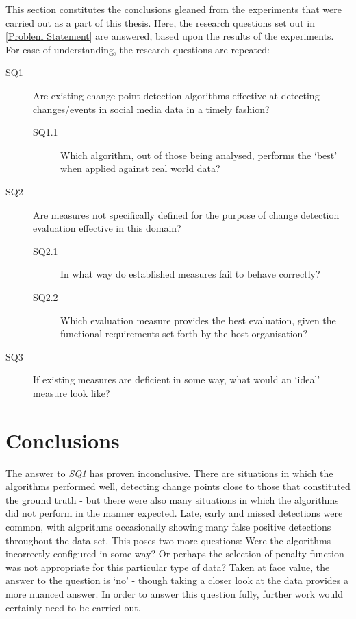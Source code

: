 \documentclass[../main.tex]{subfiles}
\begin{document}
\label{conclusions}

This section constitutes the conclusions gleaned from the experiments that were carried out as a part of this thesis. Here, the research questions set out in \autoref{Problem Statement} are answered, based upon the results of the experiments. For ease of understanding, the research questions are repeated:

\begin{description}
	\item[SQ1] Are existing change point detection algorithms effective at detecting changes/events in social media data in a timely fashion?
	\begin{description}
	\item[SQ1.1] Which algorithm, out of those being analysed, performs the `best' when applied against real world data?
	\end{description}
	\item[SQ2] Are measures not specifically defined for the purpose of change detection evaluation effective in this domain?
	\begin{description}
	\item[SQ2.1] In what way do established measures fail to behave correctly?
    \item[SQ2.2] Which evaluation measure provides the best evaluation, given the functional requirements set forth by the host organisation?
    \end{description}
	\item[SQ3] If existing measures are deficient in some way, what would an `ideal' measure look like?
\end{description}

\section{Conclusions}

The answer to \emph{SQ1} has proven inconclusive. There are situations in which the algorithms performed well, detecting change points close to those that constituted the ground truth - but there were also many situations in which the algorithms did not perform in the manner expected. Late, early and missed detections were common, with algorithms occasionally showing many false positive detections throughout the data set. This poses two more questions: Were the algorithms incorrectly configured in some way? Or perhaps the selection of penalty function was not appropriate for this particular type of data? Taken at face value, the answer to the question is `no' - though taking a closer look at the data provides a more nuanced answer. In order to answer this question fully, further work would certainly need to be carried out.
\end{document}
